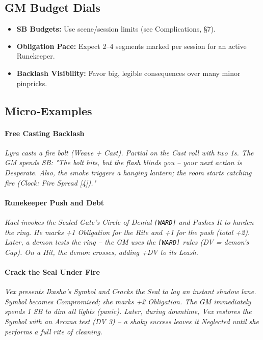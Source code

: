 \subsection{GM Budget Dials}
\begin{itemize}
  \item \textbf{SB Budgets:} Use scene/session limits (see Complications, §7).
  \item \textbf{Obligation Pace:} Expect 2–4 segments marked per session for an active Runekeeper.
  \item \textbf{Backlash Visibility:} Favor big, legible consequences over many minor pinpricks.
\end{itemize}

\subsection{Micro‑Examples}

\paragraph{Free Casting Backlash}
\emph{Lyra casts a fire bolt (Weave + Cast). Partial on the Cast roll with two 1s. The GM spends SB: "The bolt hits, but the flash blinds you – your next action is Desperate. Also, the smoke triggers a hanging lantern; the room starts catching fire (Clock: Fire Spread [4])."}

\paragraph{Runekeeper Push and Debt}
\emph{Kael invokes the Sealed Gate's \textit{Circle of Denial} \texttt{[WARD]} and Pushes It to harden the ring. He marks +1 Obligation for the Rite and +1 for the push (total +2). Later, a demon tests the ring – the GM uses the \texttt{[WARD]} rules (DV = demon's Cap). On a Hit, the demon crosses, adding +DV to its Leash.}

\paragraph{Crack the Seal Under Fire}
\emph{Vex presents Ikasha's Symbol and Cracks the Seal to lay an instant shadow lane. Symbol becomes Compromised; she marks +2 Obligation. The GM immediately spends 1 SB to dim all lights (panic). Later, during downtime, Vex restores the Symbol with an Arcana test (DV 3) – a shaky success leaves it Neglected until she performs a full rite of cleaning.}